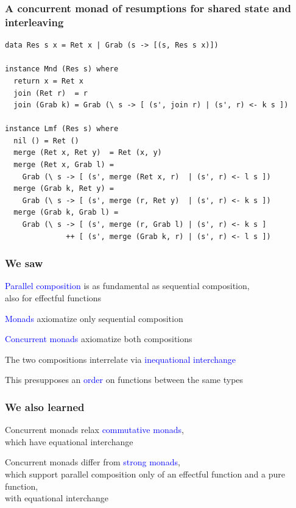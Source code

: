 \documentclass[aspectratio=169,11pt]{beamer}
\newcommand{\ema}[1]{\textcolor{blue}{#1}}
\begin{document}
\begin{frame}[fragile]

  \frametitle{A concurrent monad of resumptions for shared state
    and interleaving}

\scriptsize
  
\begin{verbatim}
data Res s x = Ret x | Grab (s -> [(s, Res s x)])

instance Mnd (Res s) where 
  return x = Ret x
  join (Ret r)  = r
  join (Grab k) = Grab (\ s -> [ (s', join r) | (s', r) <- k s ])

instance Lmf (Res s) where
  nil () = Ret ()
  merge (Ret x, Ret y)  = Ret (x, y)
  merge (Ret x, Grab l) =
    Grab (\ s -> [ (s', merge (Ret x, r)  | (s', r) <- l s ])
  merge (Grab k, Ret y) = 
    Grab (\ s -> [ (s', merge (r, Ret y)  | (s', r) <- k s ])
  merge (Grab k, Grab l) =
    Grab (\ s -> [ (s', merge (r, Grab l) | (s', r) <- k s ]
              ++ [ (s', merge (Grab k, r) | (s', r) <- l s ])
\end{verbatim}
  
\end{frame}


\begin{frame}

\frametitle{We saw}

  \ema{Parallel composition} is as fundamental as sequential
  composition, \\ also for effectful functions

  \ema{Monads} axiomatize only sequential composition

\bigskip  

  \ema{Concurrent monads} axiomatize both compositions
  
  The two compositions interrelate via \ema{inequational interchange}

  This presupposes an \ema{order} on functions between the
  same types

\end{frame}


\begin{frame}

\frametitle{We also learned}


  Concurrent monads relax \ema{commutative monads}, \\
  which have equational interchange

\bigskip
  
  Concurrent monads differ from \ema{strong monads}, \\
  which support parallel
  composition only of an effectful function and a pure
  function, \\ with equational interchange

  
\end{frame}
  
\end{document}
